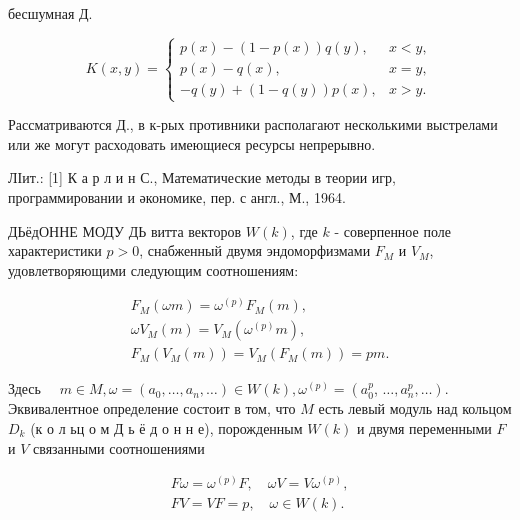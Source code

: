 \documentclass[10pt]{article}
\begin{document}
бесшумная Д.



\[

K(x, y)= \begin{cases}p(x)-(1-p(x)) q(y), & x<y, \\ p(x)-q(x), & x=y, \\ -q(y)+(1-q(y)) p(x), & x>y .\end{cases}

\]



Рассматриваются Д., в к-рых противники располагают несколькими выстрелами или же могут расходовать имеющиеся ресурсы непрерывно.



ЛІит.: [1] К а р л и н С., Математические методы в теории игр, программировании и әкономике, пер. с англ., М., 1964.



ДЬёдОННЕ МОДУ ДЬ витта векторов $W(k)$, где $k$ - соверпенное поле характеристики $p>0$, снабженный двумя эндоморфизмами $F_{M}$ и $V_{M}$, удовлетворяющими следующим соотношениям:



\[

\begin{gathered}

F_{M}(\omega m)=\omega^{(p)} F_{M}(m), \\

\omega V_{M}(m)=V_{M}\left(\omega^{(p)} m\right), \\

F_{M}\left(V_{M}(m)\right)=V_{M}\left(F_{M}(m)\right)=p m .

\end{gathered}

\]



Здесь $\quad m \in M, \omega=\left(a_{0}, \ldots, a_{n}, \ldots\right) \in W(k), \omega^{(p)}=\left(a_{0}^{p}\right.$, $\left.\ldots, a_{n}^{p}, \ldots\right)$. Эквивалентное определение состоит в том, что $M$ есть левый модуль над кольцом $D_{k}$ (к о л ьц о м Д ь ё д о н н е), порожденным $W(k)$ и двумя переменными $F$ и $V$ связанными соотношениями



\[

\begin{gathered}

F \omega=\omega^{(p)} F, \quad \omega V=V \omega^{(p)}, \\

F V=V F=p, \quad \omega \in W(k) .

\end{gathered}

\]
\end{document}
